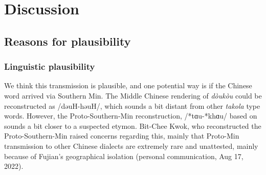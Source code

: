 \documentclass[12pt]{article}
\begin{document}


\section{Discussion}

\subsection{Reasons for plausibility}

\subsubsection{Linguistic plausibility}

We think this transmission is plausible, and one potential way is if the Chinese word arrived via Southern Min. The Middle Chinese rendering of \textit{dòukòu} could be reconstructed as /dəuH-həuH/, which sounds  a bit distant from other \textit{takola} type words. However, the Proto-Southern-Min reconstruction, /*tɑu-*khɑu/ based on \textcite{kwok_2018_southern} sounds a bit closer to a suspected etymon. Bit-Chee Kwok, who reconstructed the Proto-Southern-Min raised concerns regarding this, mainly that Proto-Min transmission to other Chinese dialects are extremely rare and unattested, mainly because of Fujian's geographical isolation (personal communication, Aug 17, 2022).


\end{document}
